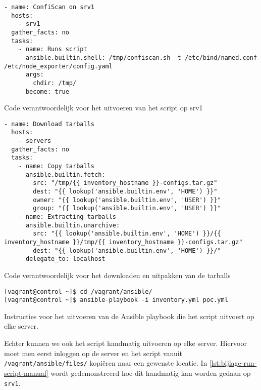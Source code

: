 \begin{listing}
  \begin{verbatim}
- name: ConfiScan on srv1
  hosts:
    - srv1
  gather_facts: no
  tasks:
    - name: Runs script
      ansible.builtin.shell: /tmp/confiscan.sh -t /etc/bind/named.conf /etc/node_exporter/config.yaml
      args:
        chdir: /tmp/
      become: true
    \end{verbatim}
    \caption[Uitvoeren van script op \texttt{srv1}.]{Code verantwoordelijk voor het uitvoeren van het script op srv1}
    \label{lst:bijlage-run-script}
\end{listing}

\begin{listing}
  \begin{verbatim}
- name: Download tarballs
  hosts:
    - servers
  gather_facts: no
  tasks:
    - name: Copy tarballs
      ansible.builtin.fetch:
        src: "/tmp/{{ inventory_hostname }}-configs.tar.gz"
        dest: "{{ lookup('ansible.builtin.env', 'HOME') }}"
        owner: "{{ lookup('ansible.builtin.env', 'USER') }}"
        group: "{{ lookup('ansible.builtin.env', 'USER') }}"
    - name: Extracting tarballs
      ansible.builtin.unarchive:
        src: "{{ lookup('ansible.builtin.env', 'HOME') }}/{{ inventory_hostname }}/tmp/{{ inventory_hostname }}-configs.tar.gz"
        dest: "{{ lookup('ansible.builtin.env', 'HOME') }}/"
      delegate_to: localhost
  \end{verbatim}
  \caption[Downloaden en uitpakken van tarballs.]{Code verantwoordelijk voor het downloaden en uitpakken van de tarballs}
  \label{lst:bijlage-tarballs}
\end{listing}

\begin{listing}
  \begin{verbatim}
[vagrant@control ~]$ cd /vagrant/ansible/
[vagrant@control ~]$ ansible-playbook -i inventory.yml poc.yml
  \end{verbatim}
  \caption[Uitvoeren van Ansible playbook.]{Instructies voor het uitvoeren van de Ansible playbook die het script uitvoert op elke server.}
  \label{lst:bijlage-run-playbook}
\end{listing}

Echter kunnen we ook het script handmatig uitvoeren op elke server.
Hiervoor moet men eerst inloggen op de server en het script vanuit \texttt{/vagrant/ansible/files/} kopi\"eren naar een gewenste locatie.
In \ref{lst:bijlage-run-script-manual} wordt gedemonstreerd hoe dit handmatig kan worden gedaan op \texttt{srv1}.

